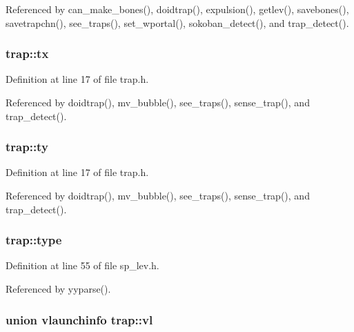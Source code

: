 Referenced by can\+\_\+make\+\_\+bones(), doidtrap(), expulsion(), getlev(), savebones(), savetrapchn(), see\+\_\+traps(), set\+\_\+wportal(), sokoban\+\_\+detect(), and trap\+\_\+detect().

\hypertarget{structtrap_a8a3d31070852119ee66c8662b0c883c7}{
\subsubsection[{tx}]{ trap\+::tx}}\label{structtrap_a8a3d31070852119ee66c8662b0c883c7}


Definition at line 17 of file trap.\+h.



Referenced by doidtrap(), mv\+\_\+bubble(), see\+\_\+traps(), sense\+\_\+trap(), and trap\+\_\+detect().

\hypertarget{structtrap_a579c4f0e2d31e3657c930d6741737b20}{
\subsubsection[{ty}]{ trap\+::ty}}\label{structtrap_a579c4f0e2d31e3657c930d6741737b20}


Definition at line 17 of file trap.\+h.



Referenced by doidtrap(), mv\+\_\+bubble(), see\+\_\+traps(), sense\+\_\+trap(), and trap\+\_\+detect().

\hypertarget{structtrap_a6433bf21fd55f30507100598399aa727}{
\subsubsection[{type}]{ trap\+::type}}\label{structtrap_a6433bf21fd55f30507100598399aa727}


Definition at line 55 of file sp\+\_\+lev.\+h.



Referenced by yyparse().

\hypertarget{structtrap_a29973ce0aef5c50240f86e0fc8d63fe9}{
\subsubsection[{vl}]{\setlength{\rightskip}{0pt plus 5cm}union {\bf vlaunchinfo} trap\+::vl}}\label{structtrap_a29973ce0aef5c50240f86e0fc8d63fe9}


